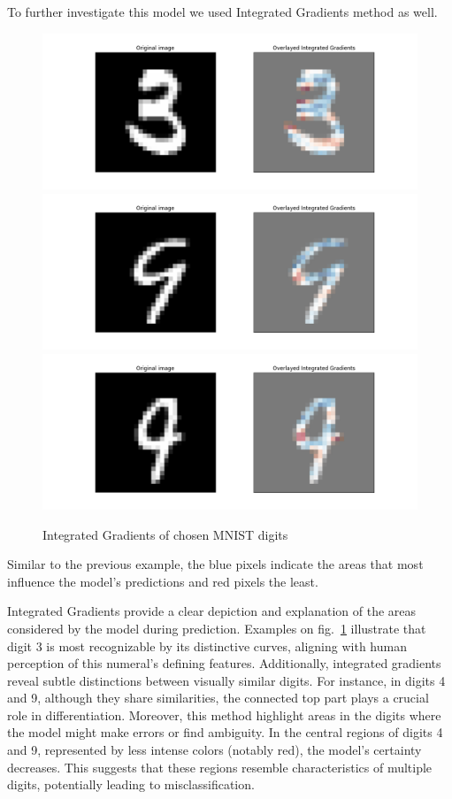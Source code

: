 \documentclass[journal, a4paper]{IEEEtran}
\begin{document}
To further investigate this model we used Integrated Gradients method as well.
\begin{figure}[h]\centering
    \includegraphics[width=.6\linewidth]{img/integrated_grad/mnist_CNN/3}
    \includegraphics[width=.6\linewidth]{img/integrated_grad/mnist_CNN/4_again2}
    \includegraphics[width=.6\linewidth]{img/integrated_grad/mnist_CNN/9}
    \caption{Integrated Gradients of chosen MNIST digits}\label{fig:mnist-cnn-integrated-grad}
\end{figure}
Similar to the previous example, the blue pixels indicate the areas that most influence the model's predictions and red pixels the least.

Integrated Gradients provide a clear depiction and explanation of the areas considered by the model during prediction.
Examples on fig.~\ref{fig:mnist-cnn-integrated-grad} illustrate that digit 3 is most recognizable by its distinctive curves, aligning with human perception of this numeral's defining features.
Additionally, integrated gradients reveal subtle distinctions between visually similar digits.
For instance, in digits 4 and 9, although they share similarities, the connected top part plays a crucial role in differentiation.
Moreover, this method highlight areas in the digits where the model might make errors or find ambiguity.
In the central regions of digits 4 and 9, represented by less intense colors (notably red), the model's certainty decreases.
This suggests that these regions resemble characteristics of multiple digits, potentially leading to misclassification.
\end{document}
